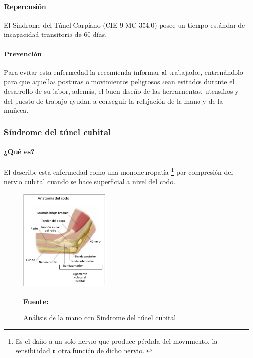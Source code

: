 \paragraph{Repercusión}
El Síndrome del Túnel Carpiano (CIE-9 MC 354.0) posee un tiempo estándar de incapacidad transitoria de 60 días\parencite[6]{INSHT2017SindromeCarpiano}.
\paragraph{Prevención}
Para evitar esta enfermedad la \parencite{FundacionSantaFedeBogota2016SindromeTratarlo} recomienda informar al trabajador, entrenándolo para que aquellas posturas o movimientos peligrosos sean evitados durante el desarrollo de su labor, además, el buen diseño de las herramientas, utensilios y del puesto de trabajo ayudan a conseguir la relajación de la mano y de la muñeca.

\subsubsection{Síndrome del túnel cubital}
\paragraph{¿Qué es?}
El \parencite[1]{INSHT2017SindromeCodo} describe esta enfermedad como una mononeuropatía \footnote{Es el daño a un solo nervio que produce pérdida del movimiento, la sensibilidad u otra función de dicho nervio. \parencite{MedlinePlus2018Mononeuropatia}} por compresión del nervio cubital cuando se hace superficial a nivel del codo.
\begin{figure}[H]
    \centering
    \includegraphics[width=0.4\textwidth]{Anexos/LATEX/chapters/images/AnaCodo.png}
    \caption{Análisis de la mano con Sindrome del túnel cubital}
    \small{\textbf{Fuente:} \parencite[1]{INSHT2017SindromeCodo}}
    \label{AnaCodo}
\end{figure}
